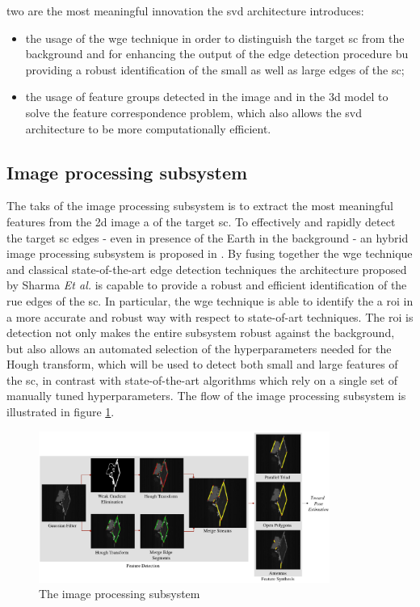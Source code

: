 two are the most meaningful innovation the \acrshort{svd} architecture introduces:
\begin{itemize}
\item the usage of the \acrshort{wge} technique in order to distinguish the target \acrshort{sc} from the background and for enhancing the output of the edge detection procedure bu providing a robust identification of the small as well as large edges of the \acrshort{sc};
\item the usage of feature groups detected in the image and in the \acrshort{3d} model to solve the feature correspondence problem, which also allows the \acrshort{svd} architecture to be more computationally efficient.  
\end{itemize}

\subsection{Image processing subsystem}
The taks of the image processing subsystem is to extract the most meaningful features from the \acrshort{2d} image a of the target \acrshort{sc}. To effectively and rapidly detect the target \acrshort{sc} edges - even in presence of the Earth in the background - an hybrid image processing subsystem is proposed in \cite{Sharma2018}. 
By fusing together the \acrshort{wge} technique and classical state-of-the-art edge detection techniques the architecture proposed by Sharma \textit{Et al.} is capable to provide a robust and efficient identification of the rue edges of the \acrshort{sc}.
In particular, the \acrshort{wge} technique is able to identify the a \acrfull{roi} in a more accurate and robust way with respect to state-of-art techniques. The \acrshort{roi} is detection not only makes the entire subsystem robust against the background, but also allows an automated selection of the hyperparameters needed for the Hough transform, which will be used to detect both small and large features of the \acrshort{sc}, in contrast with state-of-the-art algorithms which rely on a single set of manually tuned hyperparameters.
The flow of the image processing subsystem is illustrated in figure \ref{fig:imageProcessingSubsystem}.

\begin{figure}[htbp]
  \centering
  \includegraphics[width=0.85\textwidth]{gfx/imageProcessingSubsystem.eps}
  \caption{The image processing subsystem \cite{Sharma2018}}
  \label{fig:imageProcessingSubsystem}
\end{figure}


